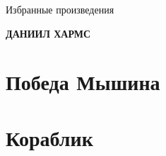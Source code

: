 \documentclass[12pt,a4paper,oneside]{book}
\begin{document}
	\begin{center}
		
		{\Large{Избранные произведения}}
		
		\vspace{0.7cm}
		
		{\huge \textbf {ДАНИИЛ ХАРМС}}
		
	\end{center}

	\tableofcontents
	
	\chapter{Победа Мышина}
	
	
	
	\chapter{Кораблик}
	
	
	
	\chapter{}
	
	
	
\end{document}
